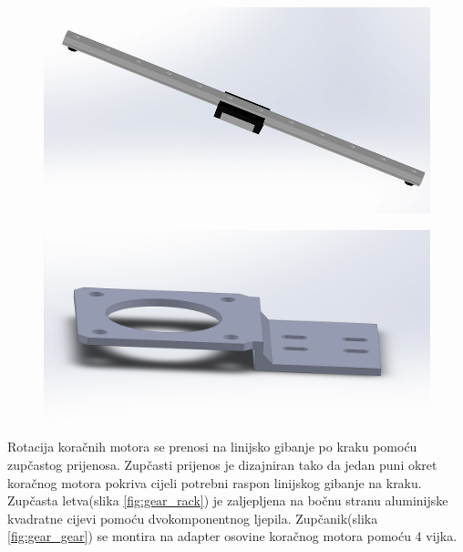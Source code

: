 \documentclass[11pt,a4paper]{article}
\begin{document}
\begin{figure}[H]
\centering
\begin{minipage}{.5\textwidth}
  \centering
  \includegraphics[width=.9\linewidth]{figures/linear_guide_7mm.png}
  \label{fig:klizni_mehanizam}
\end{minipage}%
\begin{minipage}{.5\textwidth}
  \centering
  \includegraphics[width=.9\linewidth]{figures/stepper_bracket.png}
  \label{fig:stepper_bracket}
\end{minipage}
\end{figure}

Rotacija koračnih motora se prenosi na linijsko gibanje po kraku pomoću zupčastog prijenosa. Zupčasti prijenos je dizajniran tako da jedan puni okret koračnog motora pokriva cijeli potrebni raspon linijskog gibanje na kraku. 
Zupčasta letva(slika \ref{fig:gear_rack}) je zaljepljena na bočnu stranu aluminijske kvadratne cijevi pomoću dvokomponentnog ljepila. Zupčanik(slika \ref{fig:gear_gear}) se montira na adapter osovine koračnog motora pomoću 4 vijka. 
\end{document}
